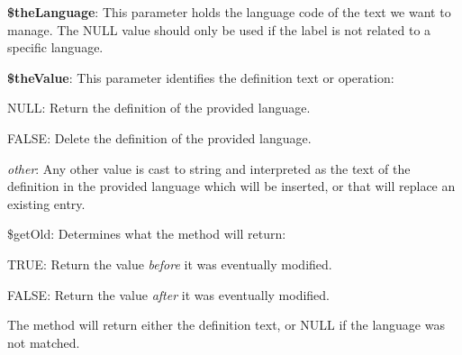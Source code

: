 \begin{DoxyItemize}
\item {\bfseries \$the\-Language}\-: This parameter holds the language code of the text we want to manage. The {\ttfamily N\-U\-L\-L} value should only be used if the label is not related to a specific language. 
\item {\bfseries \$the\-Value}\-: This parameter identifies the definition text or operation\-: 
\begin{DoxyItemize}
\item {\ttfamily N\-U\-L\-L}\-: Return the definition of the provided language. 
\item {\ttfamily F\-A\-L\-S\-E}\-: Delete the definition of the provided language. 
\item {\itshape other}\-: Any other value is cast to string and interpreted as the text of the definition in the provided language which will be inserted, or that will replace an existing entry. 
\end{DoxyItemize}
\item {\ttfamily \$get\-Old}\-: Determines what the method will return\-: 
\begin{DoxyItemize}
\item {\ttfamily T\-R\-U\-E}\-: Return the value {\itshape before} it was eventually modified. 
\item {\ttfamily F\-A\-L\-S\-E}\-: Return the value {\itshape after} it was eventually modified. 
\end{DoxyItemize}
\end{DoxyItemize}

The method will return either the definition text, or {\ttfamily N\-U\-L\-L} if the language was not matched.


